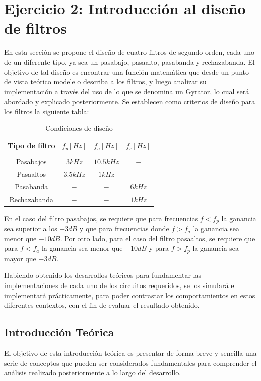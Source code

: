 \section{Ejercicio 2: Introducci\'on al dise\~no de filtros}
En esta secci\'on se propone el dise\~no de cuatro filtros de segundo orden, cada uno de un diferente tipo,
ya sea un pasabajo, pasaalto, pasabanda y rechazabanda. El objetivo de tal dise\~no es encontrar una funci\'on matem\'atica
que desde un punto de vista te\'orico modele o describa a los filtros, y luego analizar su implementaci\'on a trav\'es del uso de lo que se
denomina un Gyrator, lo cual ser\'a abordado y explicado posteriormente. Se establecen como criterios de dise\~no para los filtros la siguiente tabla:

\begin{table}[H]
    \centering
    \begin{tabular}{c c c c}
        Tipo de filtro & $f_p [Hz]$ & $f_a [Hz]$ & $f_c [Hz]$ \\
        \hline \\
        Pasabajos & $3kHz$ & $10.5kHz$ & $-$ \\
        Pasaaltos & $3.5kHz$ & $1kHz$ & $-$ \\
        Pasabanda & $-$ & $-$ & $6kHz$ \\
        Rechazabanda & $-$ & $-$ & $1kHz$ \\
        \hline
    \end{tabular}
    \caption{Condiciones de dise\~no}
\end{table}

En el caso del filtro pasabajos, se requiere que para frecuencias $f < f_p$ la ganancia sea superior a los $-3dB$ y que para frecuencias donde $f > f_a$ la ganancia
sea menor que $-10dB$. Por otro lado, para el caso del filtro pasaaltos, se requiere que para $f < f_a$ la ganancia sea menor que $-10dB$ y para $f > f_p$ la ganancia
sea mayor que $-3dB$.

Habiendo obtenido los desarrollos te\'oricos para fundamentar las implementaciones de cada uno de los circuitos requeridos, se los simular\'a e
implementar\'a pr\'acticamente, para poder contrastar los comportamientos en estos diferentes contextos, con el fin de evaluar el resultado obtenido.

\subsection{Introducci\'on Te\'orica}
El objetivo de esta introducci\'on te\'orica es presentar de forma breve y sencilla una serie de conceptos que pueden ser considerados fundamentales
para comprender el an\'alisis realizado posteriormente a lo largo del desarrollo.

